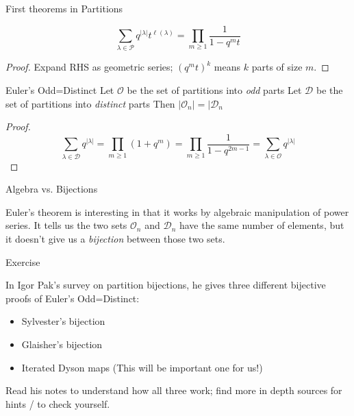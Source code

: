 \documentclass{beamer}
\begin{document}
\begin{frame}{First theorems in Partitions}
\begin{theorem}
$$\sum_{\lambda\in\mathcal{P}} q^{|\lambda|}t^{\ell(\lambda)}=\prod_{m\geq 1} \frac{1}{1-q^mt}$$
\end{theorem}
\begin{proof}
Expand RHS as geometric series; $(q^mt)^k$ means $k$ parts of size $m$.
\end{proof}

\begin{theorem}{Euler's Odd=Distinct} 
Let $\mathcal{O}$ be the set of partitions into \emph{odd} parts
Let $\mathcal{D}$ be the set of partitions into \emph{distinct} parts
Then $|\mathcal{O}_n|=|\mathcal{D}_n$
\end{theorem}
\begin{proof}
$$\sum_{\lambda\in\mathcal{D}}q^{|\lambda|}=\prod_{m\geq 1} (1+q^m)=\prod_{m\geq 1} \frac{1}{1-q^{2m-1}}=\sum_{\lambda\in\mathcal{O}} q^{|\lambda|}$$
\end{proof}

\end{frame}


\begin{frame}{Algebra vs. Bijections}

Euler's theorem is interesting in that it works by algebraic manipulation of power series.  It tells us the two sets $\mathcal{O}_n$ and $\mathcal{D}_n$ have the same number of elements, but it doesn't give us a \emph{bijection} between those two sets.  

\begin{block}{Exercise}

In Igor Pak's survey on partition bijections, he gives three different bijective proofs of Euler's Odd=Distinct:

\begin{itemize}
\item Sylvester's bijection
\item Glaisher's bijection
\item Iterated Dyson maps (This will be important one for us!)
\end{itemize}

Read his notes to understand how all three work; find more in depth sources for hints / to check yourself.
\end{block}

\end{frame}
\end{document}
